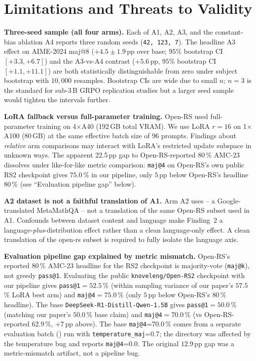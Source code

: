 \documentclass[journal,onecolumn,11pt]{IEEEtran}
\newcommand{\armA}{\textsc{A1}}
\newcommand{\armB}{\textsc{A2}}
\newcommand{\armC}{\textsc{A3}}
\newcommand{\armD}{\textsc{A4}}
\begin{document}
\section{Limitations and Threats to Validity}
\label{sec:limitations}

\textbf{Three-seed sample (all four arms).} Each of \armA{}, \armB{},
\armC{}, and the constant-bias ablation \armD{} reports three random seeds
(\texttt{42, 123, 7}). The headline \armC{} effect on AIME-2024 maj@8
($+4.5\pm 1.9$\,pp over base; $95\%$ bootstrap CI $[+3.3, +6.7]$) and the
\armC{}-vs-\armD{} contrast ($+5.6$\,pp, $95\%$ bootstrap CI
$[+1.1, +11.1]$) are both statistically distinguishable from zero under
subject bootstrap with $10{,}000$ resamples. Bootstrap CIs are wide due to
small $n$; $n=3$ is the standard for sub-3\,B GRPO replication studies but a
larger seed sample would tighten the intervals further.

\textbf{LoRA fallback versus full-parameter training.} Open-RS used
full-parameter training on 4$\times$A40 (192\,GB total VRAM). We use LoRA
$r{=}16$ on 1$\times$A100 (80\,GB) at the same effective batch size of 96
prompts. Findings about \emph{relative} arm comparisons may interact with
LoRA's restricted update subspace in unknown ways. The apparent 22.5\,pp
gap to Open-RS-reported $80$\,\% AMC-23 dissolves under like-for-like
metric comparison: \texttt{maj@4} on Open-RS's own public RS2 checkpoint
gives $75.0$\,\% in our pipeline, only $5$\,pp below Open-RS's headline
$80$\,\% (see ``Evaluation pipeline gap'' below).

\textbf{\armB{} dataset is not a faithful translation of \armA{}.} Arm
\armB{} uses
 -- a Google-translated
MetaMathQA -- not a translation of the same Open-RS subset used in \armA{}.
Confounds between dataset content and language make Finding~2 a
language-\emph{plus}-distribution effect rather than a clean language-only
effect. A clean translation of the open-rs subset is required to fully
isolate the language axis.

\textbf{Evaluation pipeline gap explained by metric mismatch.} Open-RS's
reported $80$\,\% AMC-23 headline for the RS2 checkpoint is majority-vote
(\texttt{maj@k}), not greedy \texttt{pass@1}. Evaluating the public
\texttt{knoveleng/Open-RS2} checkpoint with our pipeline gives
\texttt{pass@1}$=52.5$\,\% (within sampling variance of our paper's $57.5$\,\%
LoRA best arm) and \texttt{maj@4}$=75.0$\,\% (only $5$\,pp below Open-RS's
$80$\,\% headline). The base \texttt{DeepSeek-R1-Distill-Qwen-1.5B} gives
\texttt{pass@1}$=50.0$\,\% (matching our paper's $50.0$\,\% base claim) and
\texttt{maj@4}$=70.0$\,\% (vs Open-RS-reported $62.9$\,\%, $+7$\,pp above).
The base \texttt{maj@4}=70.0\,\% comes from a separate evaluation batch
() run with \texttt{temperature\_maj}=0.7;
the  directory was affected by the
temperature bug and reports \texttt{maj@4}=0.0. The original $12.9$\,pp
gap was a metric-mismatch artifact, not a pipeline bug.
\end{document}
